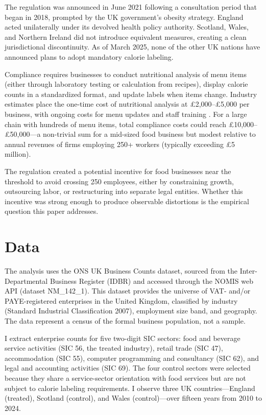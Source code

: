 \documentclass[12pt]{article}
\begin{document}
The regulation was announced in June 2021 following a consultation period that began in 2018, prompted by the UK government's obesity strategy. England acted unilaterally under its devolved health policy authority. Scotland, Wales, and Northern Ireland did not introduce equivalent measures, creating a clean jurisdictional discontinuity. As of March 2025, none of the other UK nations have announced plans to adopt mandatory calorie labeling.

Compliance requires businesses to conduct nutritional analysis of menu items (either through laboratory testing or calculation from recipes), display calorie counts in a standardized format, and update labels when items change. Industry estimates place the one-time cost of nutritional analysis at \pounds2,000--\pounds5,000 per business, with ongoing costs for menu updates and staff training \citep{dhsc2021impact}. For a large chain with hundreds of menu items, total compliance costs could reach \pounds10,000--\pounds50,000---a non-trivial sum for a mid-sized food business but modest relative to annual revenues of firms employing 250+ workers (typically exceeding \pounds5 million).

The regulation created a potential incentive for food businesses near the threshold to avoid crossing 250 employees, either by constraining growth, outsourcing labor, or restructuring into separate legal entities. Whether this incentive was strong enough to produce observable distortions is the empirical question this paper addresses.


\section{Data}
\label{sec:data}

The analysis uses the ONS UK Business Counts dataset, sourced from the Inter-Departmental Business Register (IDBR) and accessed through the NOMIS web API (dataset NM\_142\_1). This dataset provides the universe of VAT- and/or PAYE-registered enterprises in the United Kingdom, classified by industry (Standard Industrial Classification 2007), employment size band, and geography. The data represent a census of the formal business population, not a sample.

I extract enterprise counts for five two-digit SIC sectors: food and beverage service activities (SIC 56, the treated industry), retail trade (SIC 47), accommodation (SIC 55), computer programming and consultancy (SIC 62), and legal and accounting activities (SIC 69). The four control sectors were selected because they share a service-sector orientation with food services but are not subject to calorie labeling requirements. I observe three UK countries---England (treated), Scotland (control), and Wales (control)---over fifteen years from 2010 to 2024.
\end{document}

